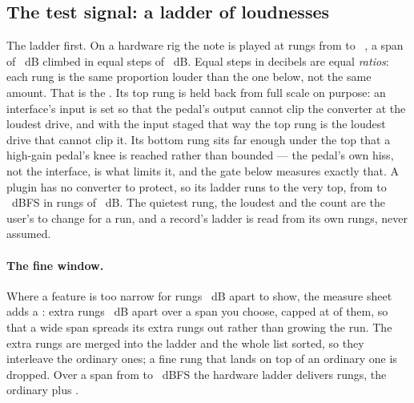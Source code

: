 \documentclass[11pt,a4paper]{article}
\begin{document}
\subsection{The test signal: a ladder of loudnesses}

The ladder first. On a hardware rig the note is played at
\cmpHardwareSteps{} rungs from \cmpHardwareFloorDBFS{} to
\cmpHardwareCeilingDBFS{}~, a span of \cmpHardwareTravelDB{}~dB
climbed in equal steps of \cmpHardwareStepDB{}~dB. Equal steps in decibels
are equal \emph{ratios}: each rung is the same proportion louder than the
one below, not the same amount. That is the . Its top
rung is held back from full scale on purpose: an interface's input is set
so that the pedal's output cannot clip the converter at the loudest drive,
and with the input staged that way the top rung is the loudest drive that
cannot clip it. Its bottom rung sits far enough under the top that a
high-gain pedal's knee is reached rather than bounded --- the pedal's own
hiss, not the interface, is what limits it, and the gate below measures
exactly that. A plugin has no converter to protect, so its ladder runs to
the very top, from \cmpPluginFloorDBFS{} to \cmpPluginCeilingDBFS{}~dBFS
in \cmpPluginSteps{} rungs of \cmpPluginStepDB{}~dB. The quietest rung, the
loudest and the count are the user's to change for a run, and a record's
ladder is read from its own rungs, never assumed.

\paragraph{The fine window.} Where a feature is too narrow for rungs
\cmpHardwareStepDB{}~dB apart to show, the measure sheet adds a
: extra rungs \cmpFineStepDB{}~dB apart over a span you
choose, capped at \cmpFineCap{} of them, so that a wide span spreads its
extra rungs out rather than growing the run. The extra rungs are merged
into the ladder and the whole list sorted, so they interleave the ordinary
ones; a fine rung that lands on top of an ordinary one is dropped. Over a
span from \cmpFineExampleLowDBFS{} to \cmpFineExampleHighDBFS{}~dBFS the
hardware ladder delivers \cmpFineExampleDelivered{} rungs, the ordinary
\cmpHardwareSteps{} plus \cmpFineExampleAdded{}.
\end{document}
